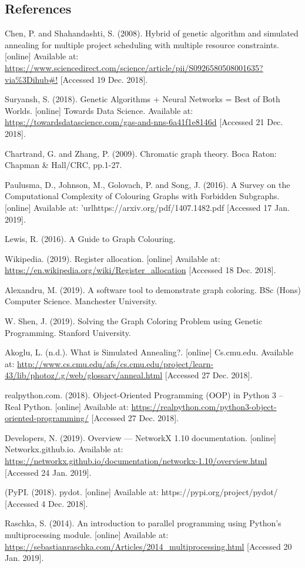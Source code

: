 \documentclass[12pt,a4paper]{article}
\begin{document}
\subsection*{References}
Chen, P. and Shahandashti, S. (2008). Hybrid of genetic algorithm and simulated annealing for multiple project scheduling with multiple resource constraints. [online] Available at: \url{https://www.sciencedirect.com/science/article/pii/S0926580508001635?via%3Dihub#!} [Accessed 19 Dec. 2018].
\par Suryansh, S. (2018). Genetic Algorithms + Neural Networks = Best of Both Worlds. [online] Towards Data Science. Available at: \url{https://towardsdatascience.com/gas-and-nns-6a41f1e8146d} [Accessed 21 Dec. 2018].
\par Chartrand, G. and Zhang, P. (2009). Chromatic graph theory. Boca Raton: Chapman \& Hall/CRC, pp.1-27.
\par Paulusma, D., Johnson, M., Golovach, P. and Song, J. (2016). A Survey on the Computational Complexity of Colouring Graphs with Forbidden Subgraphs. [online] Available at: 'url{https://arxiv.org/pdf/1407.1482.pdf} [Accessed 17 Jan. 2019].
\par Lewis, R. (2016). A Guide to Graph Colouring.
\par Wikipedia. (2019). Register allocation. [online] Available at: \url{https://en.wikipedia.org/wiki/Register_allocation} [Accessed 18 Dec. 2018].
\par Alexandru, M. (2019). A software tool to demonstrate graph coloring. BSc (Hons) Computer Science. Manchester University.
\par W. Shen, J. (2019). Solving the Graph Coloring Problem using Genetic Programming. Stanford University.
\par Akoglu, L. (n.d.). What is Simulated Annealing?. [online] Cs.cmu.edu. Available at: \url{http://www.cs.cmu.edu/afs/cs.cmu.edu/project/learn-43/lib/photoz/.g/web/glossary/anneal.html} [Accessed 27 Dec. 2018].
\par realpython.com. (2018). Object-Oriented Programming (OOP) in Python 3 – Real Python. [online] Available at: \url{https://realpython.com/python3-object-oriented-programming/} [Accessed 27 Dec. 2018].
\par Developers, N. (2019). Overview — NetworkX 1.10 documentation. [online] Networkx.github.io. Available at: \url{https://networkx.github.io/documentation/networkx-1.10/overview.html} [Accessed 24 Jan. 2019].
\par (PyPI. (2018). pydot. [online] Available at: https://pypi.org/project/pydot/ [Accessed 4 Dec. 2018].
\par Raschka, S. (2014). An introduction to parallel programming using Python's multiprocessing module. [online] Available at: \url{https://sebastianraschka.com/Articles/2014_multiprocessing.html} [Accessed 20 Jan. 2019].
\end{document}
